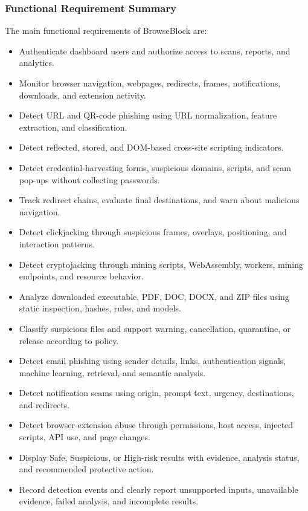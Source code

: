 \subsubsection{Functional Requirement Summary}
The main functional requirements of BrowseBlock are:
\begin{itemize}
\item Authenticate dashboard users and authorize access to scans, reports, and analytics.
\item Monitor browser navigation, webpages, redirects, frames, notifications, downloads, and extension activity.
\item Detect URL and QR-code phishing using URL normalization, feature extraction, and classification.
\item Detect reflected, stored, and DOM-based cross-site scripting indicators.
\item Detect credential-harvesting forms, suspicious domains, scripts, and scam pop-ups without collecting passwords.
\item Track redirect chains, evaluate final destinations, and warn about malicious navigation.
\item Detect clickjacking through suspicious frames, overlays, positioning, and interaction patterns.
\item Detect cryptojacking through mining scripts, WebAssembly, workers, mining endpoints, and resource behavior.
\item Analyze downloaded executable, PDF, DOC, DOCX, and ZIP files using static inspection, hashes, rules, and models.
\item Classify suspicious files and support warning, cancellation, quarantine, or release according to policy.
\item Detect email phishing using sender details, links, authentication signals, machine learning, retrieval, and semantic analysis.
\item Detect notification scams using origin, prompt text, urgency, destinations, and redirects.
\item Detect browser-extension abuse through permissions, host access, injected scripts, API use, and page changes.
\item Display Safe, Suspicious, or High-risk results with evidence, analysis status, and recommended protective action.
\item Record detection events and clearly report unsupported inputs, unavailable evidence, failed analysis, and incomplete results.
\end{itemize}

